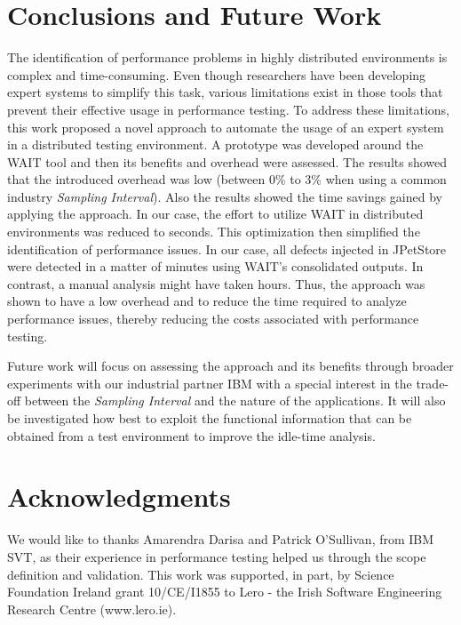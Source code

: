 \documentclass[runningheads,a4paper]{llncs}
\begin{document}
\section{Conclusions and Future Work}
\label{Conclusions}
\vspace{-7pt}

The identification of performance problems in highly
distributed environments is complex and time-consuming. Even though
researchers have been developing expert systems to simplify this task, various
limitations exist in those tools that prevent their effective usage in
performance testing. To address these limitations, this work proposed a novel
approach to automate the usage of an expert system in a distributed testing
environment. A prototype was developed around the WAIT tool and then its
benefits and overhead were assessed. The results showed that the introduced overhead was low 
(between 0\% to 3\% when using a common industry \emph{Sampling Interval}). Also
the results showed the time savings gained by applying the approach. In our case, the effort
to utilize WAIT in distributed environments was reduced to seconds. This optimization then simplified the identification of
performance issues. In our case, all defects injected in JPetStore were detected in a matter of minutes
using WAIT's consolidated outputs. In contrast, a manual analysis might have
taken hours. Thus, the approach was shown to have a low overhead and to reduce
the time required to analyze performance issues, thereby reducing the costs
associated with performance testing. 


Future work will focus on assessing the approach and its benefits through
broader experiments with our industrial partner IBM with a special interest in 
the trade-off between the \emph{Sampling Interval} and the nature of the
applications. It will also be investigated how best to exploit the functional 
information that can be obtained from a test environment to improve the
idle-time analysis.

\vspace{-8pt}
\section*{Acknowledgments}
\vspace{-7pt}
We would like to thanks Amarendra Darisa and Patrick O'Sullivan, from IBM SVT,
as their experience in performance testing helped us through the scope
definition and validation. This work was supported, in part, by Science
Foundation Ireland grant 10/CE/I1855 to Lero - the Irish Software Engineering
Research Centre (www.lero.ie).

\vspace{-8pt}



\end{document}
